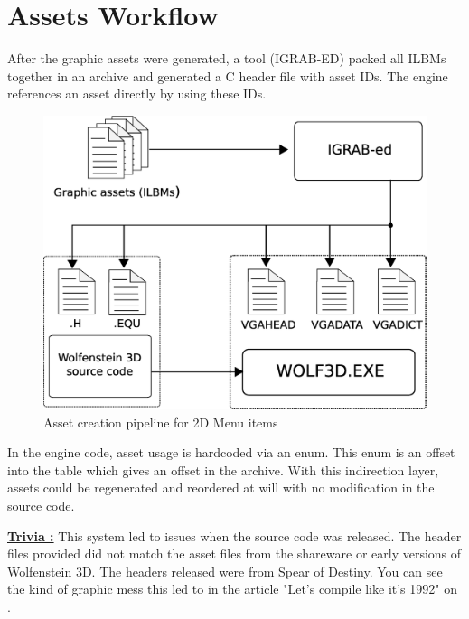 \documentclass[book.tex]{subfiles}
\begin{document}
\section{Assets Workflow}
After the graphic assets were generated, a tool (IGRAB-ED) packed all ILBMs together in an archive and generated a C header file with asset IDs. The engine references an asset directly by using these IDs.\\
\begin{figure}[H]
\centering
 \includegraphics[width=.9\textwidth]{imgs/drawings/drawing_plain.eps}
 \caption{Asset creation pipeline for 2D Menu items}
 \label{asset-creation-pipeline}
\end{figure}
\par
\begin{minipage}{\textwidth}
 \par
 \end{minipage}
 
 In the engine code, asset usage is hardcoded via an enum. This enum is an offset into the 
  table which gives an offset in the  archive. With this indirection layer, assets could be regenerated and reordered at will with no modification in the source code.\\
 \par
 \begin{minipage}{\textwidth}
 \par
 \end{minipage}
\par
\textbf{\underline{Trivia :}} This system led to issues when the source code was released. The  header files provided did not match the asset files from the shareware or early versions of Wolfenstein 3D. The headers released were from Spear of Destiny. You can see the kind of graphic mess this led to in the article "Let's compile like it's 1992" on .\\
\end{document}
